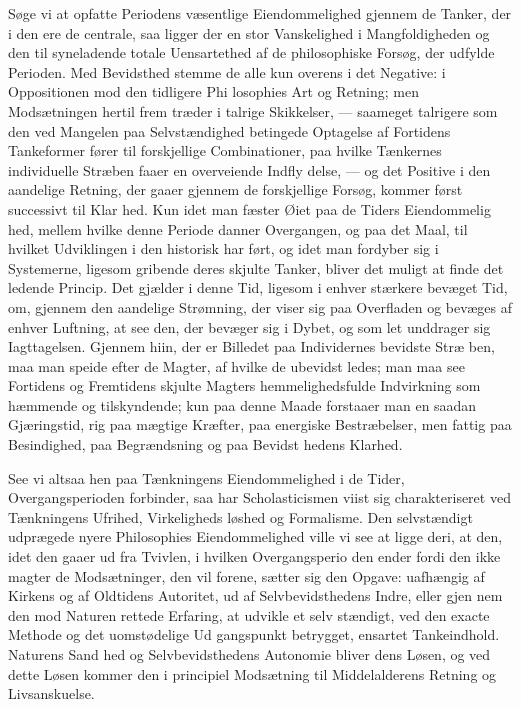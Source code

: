 \documentclass[12pt,a4paper]{book}
\begin{document}
Søge vi at opfatte Periodens væsentlige Eiendommelighed
gjennem de Tanker, der i den ere de centrale, saa ligger
der en stor Vanskelighed i Mangfoldigheden og den til\-%
syneladende totale Uensartethed af de philosophiske Forsøg,
der udfylde Perioden. Med Bevidsthed stemme de alle kun
overens i det Negative: i Oppositionen mod den tidligere Phi\-%
losophies Art og Retning; men Modsætningen hertil frem\-%
træder i talrige Skikkelser, --- saameget talrigere som den ved
Mangelen paa Selvstændighed betingede Optagelse af Fortidens
Tankeformer fører til forskjellige Combinationer, paa hvilke
Tænkernes individuelle Stræben faaer en overveiende Indfly\-%
delse, --- og det Positive i den aandelige Retning, der gaaer
gjennem de forskjellige Forsøg, kommer først successivt til Klar\-%
hed. Kun idet man fæster Øiet paa de Tiders Eiendommelig\-%
hed, mellem hvilke denne Periode danner Overgangen, og paa
det Maal, til hvilket Udviklingen i den historisk har ført, og
idet man fordyber sig i Systemerne, ligesom gribende deres
skjulte Tanker, bliver det muligt at finde det ledende Princip.
Det gjælder i denne Tid, ligesom i enhver stærkere bevæget
Tid, om, gjennem den aandelige Strømning, der viser sig paa
Overfladen og bevæges af enhver Luftning, at see den, der
bevæger sig i Dybet, og som let unddrager sig Iagttagelsen.
Gjennem hiin, der er Billedet paa Individernes bevidste Stræ\-%
ben, maa man speide efter de Magter, af hvilke de ubevidst
ledes; man maa see Fortidens og Fremtidens skjulte Magters
hemmelighedsfulde Indvirkning som hæmmende og tilskyndende;
kun paa denne Maade forstaaer man en saadan Gjæringstid,
rig paa mægtige Kræfter, paa energiske Bestræbelser, men
fattig paa Besindighed, paa Begrændsning og paa Bevidst\-%
hedens Klarhed.

See vi altsaa hen paa Tænkningens Eiendommelighed i
de Tider, Overgangsperioden forbinder, saa har Scholasticismen
viist sig charakteriseret ved Tænkningens Ufrihed, Virkeligheds\-%
løshed og Formalisme. Den selvstændigt udprægede nyere
Philosophies Eiendommelighed ville vi see at ligge deri, at
den, idet den gaaer ud fra Tvivlen, i hvilken Overgangsperio\-%
den ender fordi den ikke magter de Modsætninger, den vil
forene, sætter sig den Opgave: uafhængig af Kirkens og af
Oldtidens Autoritet, ud af Selvbevidsthedens Indre, eller gjen\-%
nem den mod Naturen rettede Erfaring, at udvikle et selv\-%
stændigt, ved den exacte Methode og det uomstødelige Ud\-%
gangspunkt betrygget, ensartet Tankeindhold. Naturens Sand\-%
hed og Selvbevidsthedens Autonomie bliver dens Løsen, og
ved dette Løsen kommer den i principiel Modsætning til
Middelalderens Retning og Livsanskuelse.
\end{document}
